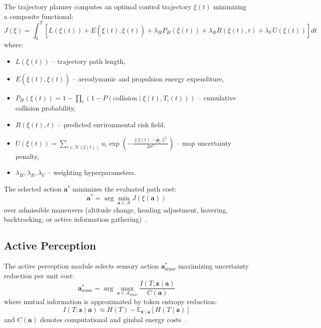 The trajectory planner computes an optimal control trajectory $\xi(t)$ minimizing a composite functional:
\begin{equation}
  J(\xi) = \int_0^T \left[ L(\xi(t)) + E(\xi(t), \dot{\xi}(t)) + \lambda_H P_H(\xi(t)) + \lambda_R R(\xi(t), t) + \lambda_U U(\xi(t)) \right] dt
\end{equation}
where:
\begin{itemize}
  \item $L(\xi(t))$ -- trajectory path length,
  \item $E(\xi(t), \dot{\xi}(t))$ -- aerodynamic and propulsion energy expenditure,
  \item $P_H(\xi(t)) = 1 - \prod_i (1 - P(\text{collision} \mid \xi(t), T_i(t)))$ -- cumulative collision probability,
  \item $R(\xi(t), t)$ -- predicted environmental risk field,
  \item $U(\xi(t)) = \sum_{i \in \mathcal{N}(\xi(t))} u_i \exp\left(-\frac{\|\xi(t) - \mathbf{p}_i\|^2}{2\sigma^2}\right)$ -- map uncertainty penalty,
  \item $\lambda_H, \lambda_R, \lambda_U$ -- weighting hyperparameters.
\end{itemize}

The selected action $\mathbf{a}^*$ minimizes the evaluated path cost:
\begin{equation}
  \mathbf{a}^* = \arg\min_{\mathbf{a} \in \mathcal{A}} J(\xi(\mathbf{a}))
\end{equation}
over admissible maneuvers (altitude change, heading adjustment, hovering, backtracking, or active information gathering)~\cite{pomianek2026s4dtam, cai2024neusis, yue2025airground, tordesillas2022faster}.

\subsection{Active Perception}
\label{subsec:active_perception}

The active perception module selects sensory action $\mathbf{a}_{\text{sense}}^*$ maximizing uncertainty reduction per unit cost:
\begin{equation}
  \mathbf{a}_{\text{sense}}^* = \arg\max_{\mathbf{a} \in \mathcal{A}_{\text{sense}}} \frac{I(T; \mathbf{z} \mid \mathbf{a})}{C(\mathbf{a})}
\end{equation}
where mutual information is approximated by token entropy reduction:
\begin{equation}
  I(T; \mathbf{z} \mid \mathbf{a}) \approx H(T) - \mathbb{E}_{\mathbf{z} \mid \mathbf{a}}[H(T \mid \mathbf{z})]
\end{equation}
and $C(\mathbf{a})$ denotes computational and gimbal energy costs~\cite{pomianek2026s4dtam, tao2024active, tian2024same}.

